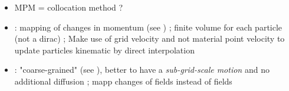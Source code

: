 
\begin{itemize}
\item MPM = collocation method ?
\item \cite{FLIP}: mapping of changes in momentum (see \cite{PIC_Nishiguchi}) ; finite volume for each particle (not a dirac) ; Make use of grid velocity and not material point velocity to update particles kinematic by direct interpolation 
\item \cite{Mass_Flip}: "coarse-grained" (see \cite{Brackbill_PIC}), better to have a \textit{sub-grid-scale motion} and no additional diffusion ; mapp changes of fields instead of fields 
\end{itemize}


